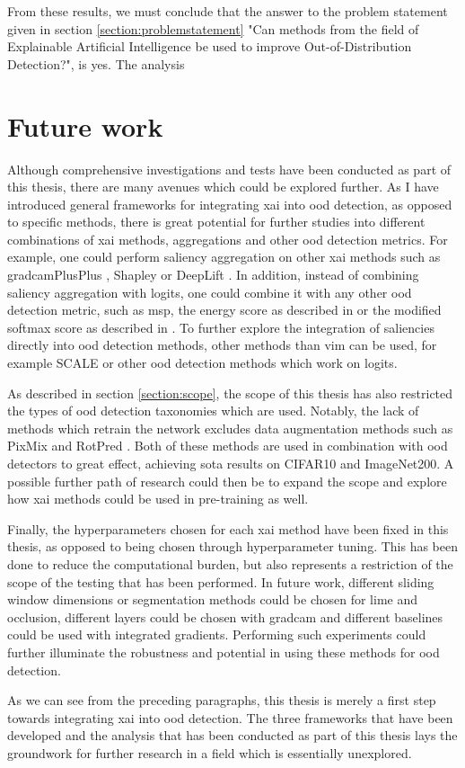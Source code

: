 \documentclass[UKenglish]{uiomasterthesis} %
\theoremstyle{definition}
\begin{document}
From these results, we must conclude that the answer to the problem statement given in section \ref{section:problemstatement} "Can methods from the field of Explainable Artificial Intelligence be used to improve Out-of-Distribution Detection?", is yes. The analysis 

\section{Future work}

Although comprehensive investigations and tests have been conducted as part of this thesis, there are many avenues which could be explored further. As I have introduced general frameworks for integrating \ac{xai} into \ac{ood} detection, as opposed to specific methods, there is great potential for further studies into different combinations of \ac{xai} methods, aggregations and other \ac{ood} detection metrics. For example, one could perform saliency aggregation on other \ac{xai} methods such as \ac{gradcam}PlusPlus \cite{gradcamplusplus}, Shapley \cite{shapley} or DeepLift \cite{deeplift}. In addition, instead of combining saliency aggregation with logits, one could combine it with any other \ac{ood} detection metric, such as \ac{msp}, the energy score as described in \cite{energy} or the modified softmax score as described in \cite{odin}. To further explore the integration of saliencies directly into \ac{ood} detection methods, other methods than \ac{vim} can be used, for example SCALE \cite{scale} or other \ac{ood} detection methods which work on logits.

As described in section \ref{section:scope}, the scope of this thesis has also restricted the types of \ac{ood} detection taxonomies which are used. Notably, the lack of methods which retrain the network excludes data augmentation methods such as PixMix \cite{pixmix} and RotPred \cite{rotpred}. Both of these methods are used in combination with \ac{ood} detectors to great effect, achieving \ac{sota} results on CIFAR10 and ImageNet200. A possible further path of research could then be to expand the scope and explore how \ac{xai} methods could be used in pre-training as well.

Finally, the hyperparameters chosen for each \ac{xai} method have been fixed in this thesis, as opposed to being chosen through hyperparameter tuning. This has been done to reduce the computational burden, but also represents a restriction of the scope of the testing that has been performed. In future work, different sliding window dimensions or segmentation methods could be chosen for \ac{lime} and occlusion, different layers could be chosen with \ac{gradcam} and different baselines could be used with integrated gradients. Performing such experiments could further illuminate the robustness and potential in using these methods for \ac{ood} detection.

As we can see from the preceding paragraphs, this thesis is merely a first step towards integrating \ac{xai} into \ac{ood} detection. The three frameworks that have been developed and the analysis that has been conducted as part of this thesis lays the groundwork for further research in a field which is essentially unexplored.

\backmatter{}
\printbibliography{}
\end{document}
